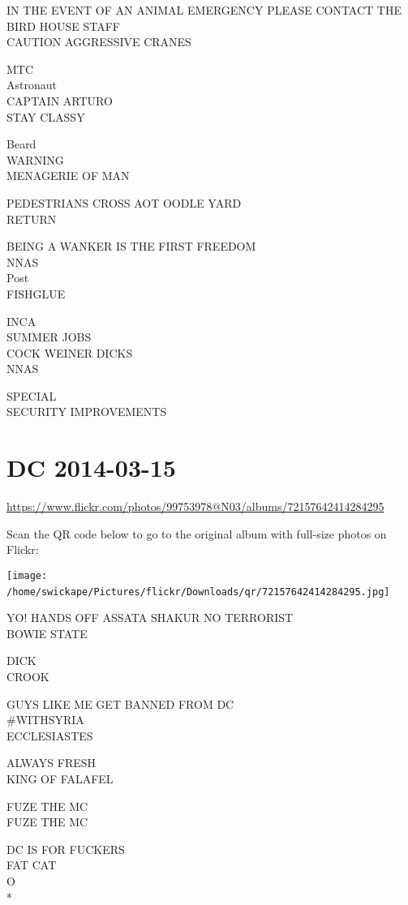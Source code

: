 \documentclass[10pt,letterpaper]{article}
\begin{document}
IN THE EVENT OF AN ANIMAL EMERGENCY PLEASE CONTACT THE BIRD HOUSE STAFF\\
CAUTION AGGRESSIVE CRANES

MTC\\
Astronaut\\
CAPTAIN ARTURO\\
STAY CLASSY

Beard\\
WARNING\\
MENAGERIE OF MAN

PEDESTRIANS CROSS AOT OODLE YARD\\
RETURN

BEING A WANKER IS THE FIRST FREEDOM\\
NNAS\\
Post\\
FISHGLUE

INCA\\
SUMMER JOBS\\
COCK WEINER DICKS\\
NNAS

SPECIAL\\
SECURITY IMPROVEMENTS
\

\section*{DC 2014-03-15}

\url{https://www.flickr.com/photos/99753978@N03/albums/72157642414284295}

Scan the QR code below to go to the original album with full-size photos on Flickr:

\texttt{[image: /home/swickape/Pictures/flickr/Downloads/qr/72157642414284295.jpg]}
\

YO!  HANDS OFF ASSATA SHAKUR NO TERRORIST\\
BOWIE STATE

DICK\\
CROOK

GUYS LIKE ME GET BANNED FROM DC\\
\#WITHSYRIA\\
ECCLESIASTES

ALWAYS FRESH\\
KING OF FALAFEL

FUZE THE MC\\
FUZE THE MC

DC IS FOR FUCKERS\\
FAT CAT\\
O\\
*
\end{document}
